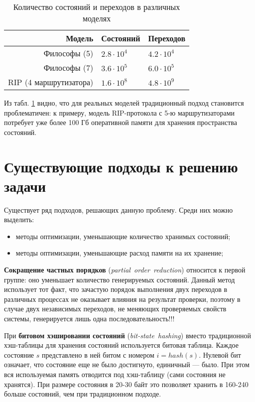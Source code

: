 \documentclass[12pt,a4paper,fleqn]{article}
\newcommand{\Term}[1]{\emph{\mbox{#1}}}
\begin{document}
\begin{table}
  \centering
  \begin{tabular}{|r|l|l|}
    \hline
    Модель                  & Состояний         & Переходов       \\
    \hline
    Философы (5)            & $2.8 \cdot 10^4$  & $4.2 \cdot 10^4$ \\
    Философы (7)            & $3.6 \cdot 10^5$  & $6.0 \cdot 10^5$ \\
    RIP (4 маршрутизатора)  & $1.6 \cdot 10^8$  & $4.8 \cdot 10^9$ \\
    \hline
  \end{tabular}
  \caption{Количество состояний и переходов в различных моделях}
\label{tab:models-statecount}
\end{table}

Из табл. \ref{tab:models-statecount} видно, что для реальных моделей традиционный подход
становится проблематичен: к примеру, модель RIP-протокола с 5-ю маршрутизаторами потребует
уже более 100 Гб оперативной памяти для хранения пространства состояний.

\section{Существующие подходы к решению задачи}

Существует ряд подходов, решающих данную проблему. Среди них можно выделить:

\begin{itemize}
\item методы оптимизации, уменьшающие количество хранимых состояний;
\item методы оптимизации, уменьшающие расход памяти на их хранение;
\end{itemize}

\textbf{Сокращение частных порядков} (\Term{partial order reduction}) относится к первой
группе: оно уменьшает количество генерируемых состояний. Данный метод использует тот факт,
что зачастую порядок выполнения двух переходов в различных процессах не оказывает влияния
на результат проверки, поэтому в случае двух независимых переходов, не меняющих
проверяемых свойств системы, генерируется лишь одна последовательность!!!

При \textbf{битовом хэшировании состояний} (\Term{bit-state hashing}) вместо традиционной
хэш-таблицы для хранения состояний используется битовая таблица. Каждое состояние $s$
представлено в ней битом с номером $i = hash(s)$. Нулевой бит означает, что состояние еще
не было достигнуто, единичный — было. При этом вся используемая память отводится под
хэш-таблицу (сами состояния не хранятся). При размере состояния в 20-30 байт это позволяет
хранить в 160-240 больше состояний, чем при традиционном подходе.
\end{document}
